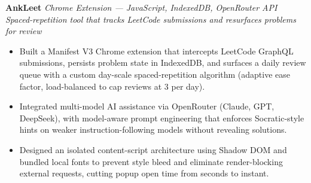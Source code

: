 \documentclass[11pt]{article}
\begin{document}
\noindent\textbf{AnkLeet} \hfill \textit{Chrome Extension --- JavaScript, IndexedDB, OpenRouter API} \\
\textit{Spaced-repetition tool that tracks LeetCode submissions and resurfaces problems for review}
\begin{itemize}
  \item Built a Manifest V3 Chrome extension that intercepts LeetCode GraphQL submissions, persists problem state in IndexedDB, and surfaces a daily review queue with a custom day-scale spaced-repetition algorithm (adaptive ease factor, load-balanced to cap reviews at 3 per day).
  \item Integrated multi-model AI assistance via OpenRouter (Claude, GPT, DeepSeek), with model-aware prompt engineering that enforces Socratic-style hints on weaker instruction-following models without revealing solutions.
  \item Designed an isolated content-script architecture using Shadow DOM and bundled local fonts to prevent style bleed and eliminate render-blocking external requests, cutting popup open time from seconds to instant.
\end{itemize}
\end{document}
